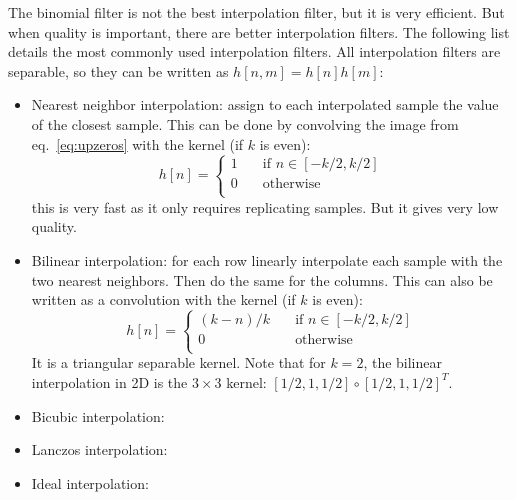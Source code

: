The binomial filter is not the best interpolation filter, but it is very efficient. But when quality is important, there are better interpolation filters.  The following list details the most commonly used interpolation filters. All interpolation filters are separable, so they can be written as $h\left[n,m\right] = h\left[n\right] h\left[m\right]$:
\begin{itemize}
\item Nearest neighbor interpolation: assign to each interpolated sample the value of the closest sample. This can be done by convolving the image from eq.~\ref{eq:upzeros} with the kernel (if $k$ is even):
\begin{equation}
h  \left[n\right] =  \begin{cases}
    1     & \quad \text{if }  n \in  \left[-k/2, k/2\right] \\
    0       & \quad \text{otherwise }\\
\end{cases}
\end{equation}
this is very fast as it only requires replicating samples. But it gives very low quality. 

\item Bilinear interpolation: for each row linearly interpolate each sample with the two nearest neighbors. Then do the same for the columns. This can also be written as a convolution with the kernel (if $k$ is even):
\begin{equation}
h  \left[n\right] =  \begin{cases}
    (k-n)/k     & \quad \text{if }  n \in \left[-k/2, k/2\right] \\
    0       & \quad \text{otherwise }\\
\end{cases}
\end{equation}
It is a triangular separable kernel. Note that for $k=2$, the bilinear interpolation in 2D is the $3 \times 3$ kernel: $\left[1/2,1,1/2\right] \circ \left[1/2,1,1/2\right]^T$.

\item Bicubic interpolation:

\item Lanczos interpolation:

\item Ideal interpolation:

\end{itemize}

